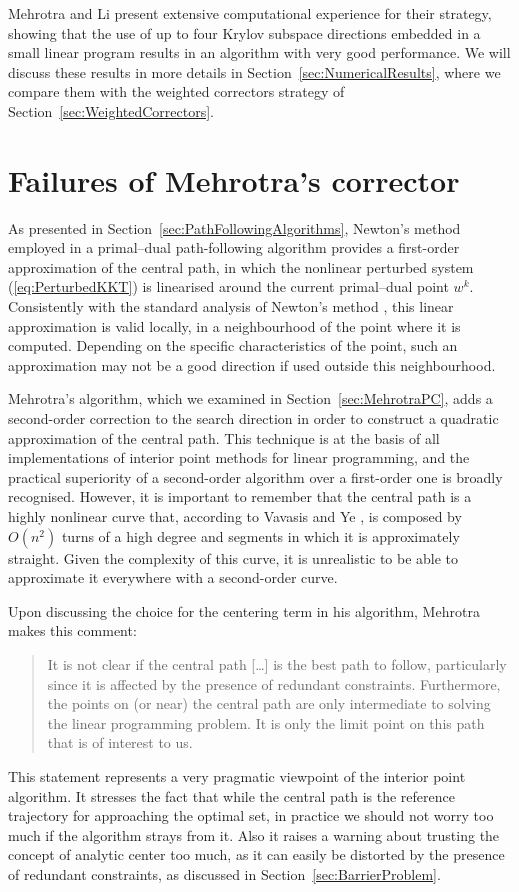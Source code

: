 Mehrotra and Li \cite{MehrotraLi} present extensive
computational experience for their strategy, showing that 
the use of up to four Krylov subspace directions embedded in a small
linear program results in an algorithm with very good performance.
We will discuss these results in more details in 
Section~\ref{sec:NumericalResults}, where we compare them with
the weighted correctors strategy of Section~\ref{sec:WeightedCorrectors}.


%
%
\section{Failures of Mehrotra's corrector}

As presented in Section~\ref{sec:PathFollowingAlgorithms},
Newton's method employed in a primal--dual path-following algorithm
provides a first-order approximation of the central path, in which
the nonlinear perturbed \KKT system (\ref{eq:PerturbedKKT}) 
is linearised around the current primal--dual point $w^k$. Consistently with 
the standard analysis of Newton's method \cite{Fletcher},
this linear approximation 
is valid locally, in a neighbourhood of the point where 
it is computed. Depending on the specific characteristics of the point, 
such an approximation may not be a good direction
if used outside this neighbourhood.

Mehrotra's algorithm, which we examined in 
Section~\ref{sec:MehrotraPC}, adds a second-order correction to the search 
direction in order to construct a quadratic approximation 
of the central path. This technique is at the basis of all
implementations of interior point methods for linear programming,
and the practical superiority of a second-order algorithm over 
a first-order one is broadly recognised.
However, it is important to remember that 
the central path is a highly nonlinear curve that, according 
to Vavasis and Ye \cite{VavasisYe}, is composed by $O(n^2)$ turns 
of a high degree and segments in which it is approximately straight. 
Given the complexity of this curve, it is unrealistic to be able 
to approximate it everywhere with a second-order curve.

Upon discussing the choice for the centering term in his algorithm,
Mehrotra \cite{Mehrotra92} makes this comment:
\begin{quotation}
It is not clear if the central path [\ldots]
is the best path to follow, particularly since it
is affected by the presence of redundant constraints. Furthermore,
the points on (or near) the central path are only intermediate to
solving the linear programming problem. It is only the limit point 
on this path that is of interest to us.
\end{quotation}
This statement represents a very pragmatic viewpoint of the interior
point algorithm. It stresses the fact that while the central path
is the reference trajectory for approaching the optimal set,
in practice we should not worry too much if the algorithm strays from it.
Also it raises a warning about trusting the concept
of analytic center too much, as it can easily be distorted by the presence
of redundant constraints, as discussed in Section~\ref{sec:BarrierProblem}.

